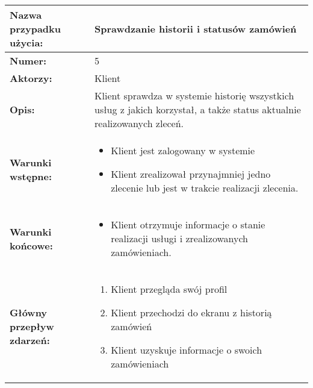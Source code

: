 \documentclass[a4paper,20pt]{article}
\begin{document}
\begin{center}
\begin{tabularx}{\textwidth}[t]{XX}

\arrayrulecolor{black}\hline
\textbf{Nazwa przypadku użycia:} & \textbf{Sprawdzanie historii i statusów zamówień} \\
\hline

\quad \textbf{Numer:} & 
\begin{minipage}[t]{\linewidth}%
5
\end{minipage}\\


\quad \textbf{Aktorzy:} & 
\begin{minipage}[t]{\linewidth}%
Klient
\end{minipage}\\


\quad \textbf{Opis:} & 
\begin{minipage}[t]{\linewidth}%
Klient sprawdza w systemie historię wszystkich usług z jakich korzystał, a także status aktualnie realizowanych zleceń.
\end{minipage}\\


\quad \textbf{Warunki wstępne:} & 
\begin{minipage}[t]{\linewidth}%
\begin{itemize}
\item Klient jest zalogowany w systemie
\item Klient zrealizował przynajmniej jedno zlecenie lub jest w trakcie realizacji zlecenia.
\end{itemize}
\end{minipage}\\


\quad \textbf{Warunki końcowe:} & 
\begin{minipage}[t]{\linewidth}%
\begin{itemize}
\item Klient otrzymuje informacje o stanie realizacji usługi i zrealizowanych zamówieniach.
\end{itemize}
\end{minipage}\\


\quad \textbf{Główny przepływ zdarzeń:} & 
\begin{minipage}[t]{\linewidth}%
\begin{enumerate}
\item Klient przegląda swój profil
\item Klient przechodzi do ekranu z historią zamówień
\item Klient uzyskuje informacje o swoich zamówieniach
\end{enumerate}
\end{minipage}\\



\end{tabularx}
\end{center}
\end{document}
